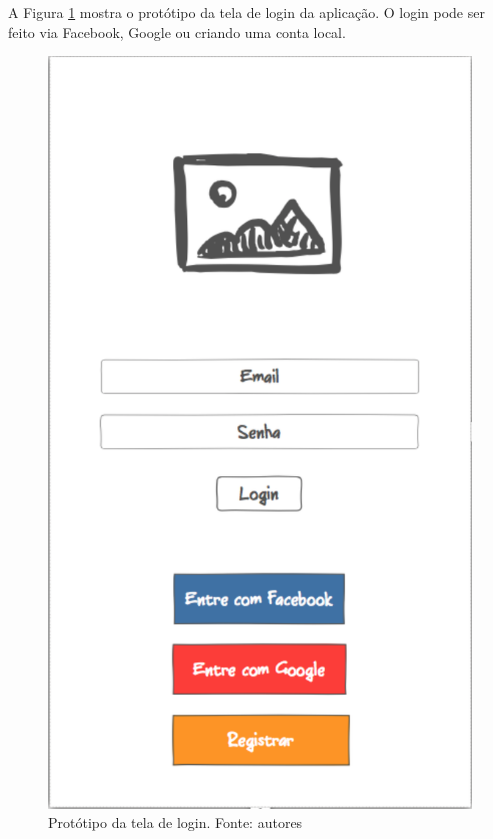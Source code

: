 A Figura \ref{img:prototipo_tela_de_login} mostra o protótipo da tela de login da aplicação. O login pode ser feito via Facebook, Google ou criando uma conta local.
\begin{figure}[H]
    \centering
    \includegraphics[scale=0.5]{figuras/prototipo_login.png}
    \caption[Protótipo da tela de login]{Protótipo da tela de login. Fonte: autores}
    \label{img:prototipo_tela_de_login}
\end{figure}
 \pagebreak

